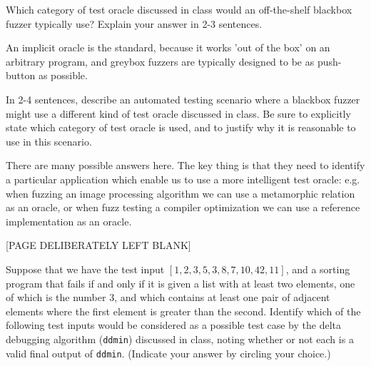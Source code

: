 \documentclass[addpoints, answers]{exam}
\newcommand{\Code}[1]{\texttt{#1}}
\begin{document}
\begin{questions}

\question[2] Which category of test oracle discussed in class would an
  off-the-shelf blackbox fuzzer typically use? Explain your answer in
  2-3 sentences.

  \begin{solution}
    An implicit oracle is the standard, because it works 'out of the
    box' on an arbitrary program, and greybox fuzzers are typically
    designed to be as push-button as possible.
  \end{solution}

\question[2] In 2-4 sentences, describe an automated testing scenario
  where a blackbox fuzzer might use a different kind of test oracle
  discussed in class. Be sure to explicitly state which category of
  test oracle is used, and to justify why it is reasonable to use in
  this scenario.


  \begin{solution}
    There are many possible answers here. The key thing is that they
    need to identify a particular application which enable us to use a
    more intelligent test oracle: e.g. when fuzzing an image
    processing algorithm we can use a metamorphic relation as an
    oracle, or when fuzz testing a compiler optimization we can use a
    reference implementation as an oracle.
  \end{solution}


\newpage
\begin{center}
  [PAGE DELIBERATELY LEFT BLANK]
\end{center}
\newpage


\question Suppose that we have the test input
  $[1, 2, 3, 5, 3, 8, 7, 10, 42, 11]$, and a sorting program that
  fails if and only if it is given a list with at least two elements,
  one of which is the number $3$, and which contains at least one pair
  of adjacent elements where the first element is greater than the
  second. Identify which of the following test inputs would be
  considered as a possible test case by the delta debugging algorithm
  (\Code{ddmin}) discussed in class, noting whether or not
  each is a valid final output of \Code{ddmin}. (Indicate
  your answer by circling your choice.)

\end{questions}
\end{document}
